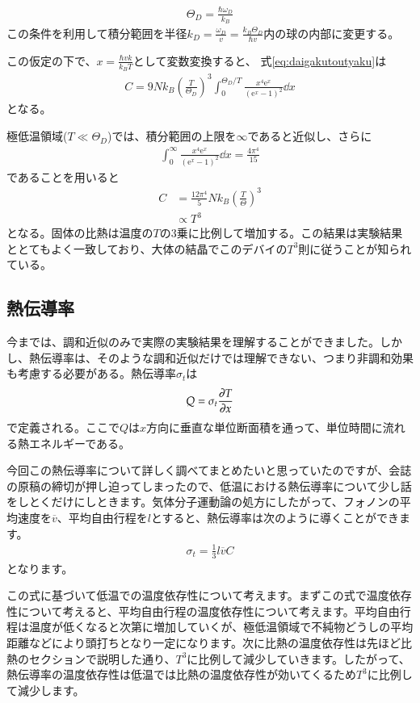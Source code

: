 \documentclass[10pt,b5paper,papersize,dvipdfmx]{jsbook}
\begin{document}
\begin{align}
  \Theta_D = \frac{\hbar \omega_D}{k_B}
\end{align}
この条件を利用して積分範囲を半径$k_D=\frac{\omega_D}{v} = \frac{k_B\Theta_D}{\hbar v}$内の球の内部に変更する。\par
この仮定の下で、$x = \frac{\hbar v k}{k_B T}$として変数変換すると、 式\ref{eq:daigakutoutyaku}は
\begin{align}
  C = 9Nk_B\left(\frac{T}{\Theta_D}\right)^3\int_0^{\Theta_D/T}\frac{x^4\mathrm{e}^x}{(\mathrm{e}^x -1)^2}\dd{x}
\end{align}
となる。\par
極低温領域($T \ll \Theta_D$)では、積分範囲の上限を$\infty$であると近似し、さらに
\begin{align}
  \int_0^\infty \frac{x^4 \mathrm{e}^x}{(\mathrm{e}^x-1)^2}\dd{x} = \frac{4\pi^4}{15}
\end{align}
であることを用いると
\begin{align}
  C &= \frac{12\pi^4}{5}Nk_B\left(\frac{T}{\Theta}\right)^3 \\
  &\propto T^3  
\end{align}
となる。固体の比熱は温度の$T$の3乗に比例して増加する。この結果は実験結果ととてもよく一致しており、大体の結晶でこのデバイの$T^3$則に従うことが知られている。
\subsection{熱伝導率}
今までは、調和近似のみで実際の実験結果を理解することができました。しかし、熱伝導率は、そのような調和近似だけでは理解できない、つまり非調和効果も考慮する必要がある。熱伝導率$\sigma_t$は
\begin{align}
  Q = \sigma_t \pdv {T}{x}
\end{align}
で定義される。ここで$Q$は$x$方向に垂直な単位断面積を通って、単位時間に流れる熱エネルギーである。\par
今回この熱伝導率について詳しく調べてまとめたいと思っていたのですが、会誌の原稿の締切が押し迫ってしまったので、低温における熱伝導率について少し話をしとくだけにしときます。気体分子運動論の処方にしたがって、フォノンの平均速度を$\overline{v}$、平均自由行程を$l$とすると、熱伝導率は次のように導くことができます。
\begin{align}
  \sigma_t = \frac{1}{3}l\overline{v}C
\end{align}
となります。\par
この式に基づいて低温での温度依存性について考えます。まずこの式で温度依存性について考えると、平均自由行程の温度依存性について考えます。平均自由行程は温度が低くなると次第に増加していくが、極低温領域で不純物どうしの平均距離などにより頭打ちとなり一定になります。次に比熱の温度依存性は先ほど比熱のセクションで説明した通り、$T^3$に比例して減少していきます。したがって、熱伝導率の温度依存性は低温では比熱の温度依存性が効いてくるため$T^3$に比例して減少します。
\end{document}
